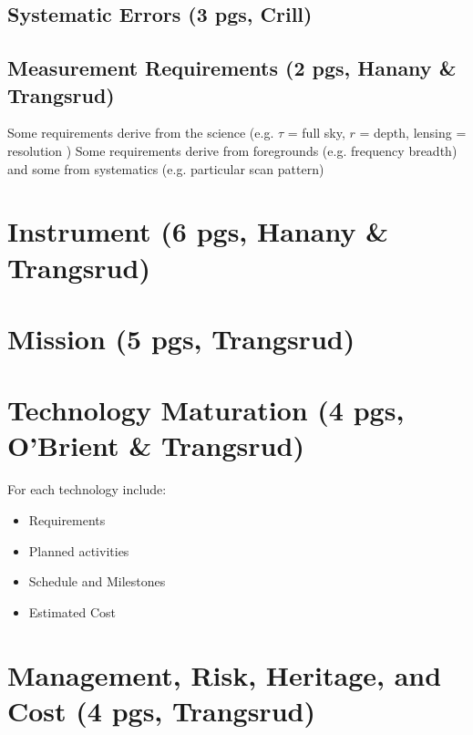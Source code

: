 \documentclass[12pt]{article}
\begin{document}



\subsection{Systematic Errors (3 pgs, Crill)}


\subsection{Measurement Requirements (2 pgs, Hanany \& Trangsrud)}

Some requirements derive from the science (e.g. $\tau$ = full sky, $r$ = depth, lensing = resolution )
Some requirements derive from foregrounds (e.g. frequency breadth) and some from systematics (e.g. particular scan pattern)


\section{Instrument (6 pgs, Hanany \& Trangsrud)}


\section{Mission (5 pgs, Trangsrud)}


\section{Technology Maturation (4 pgs, O'Brient \& Trangsrud)}


For each technology include:
\begin{itemize}
\item Requirements
\item Planned activities
\item Schedule and Milestones
\item Estimated Cost
\end{itemize}

\section{Management, Risk, Heritage, and Cost (4 pgs, Trangsrud)}


\newpage




\end{document}
